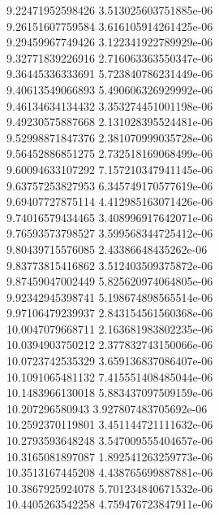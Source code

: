 {9.22471952598426 3.513025603751885e-06 \\
9.26151607759584 3.616105914261425e-06 \\
9.29459967749426 3.122341922789929e-06 \\
9.32771839226916 2.716063363550347e-06 \\
9.36445336333691 5.723840786231449e-06 \\
9.40613549066893 5.490606326929992e-06 \\
9.46134634134432 3.353274451001198e-06 \\
9.49230575887668 2.131028395524481e-06 \\
9.52998871847376 2.381070999035728e-06 \\
9.56452886851275 2.732518169068499e-06 \\
9.60094633107292 7.157210347941145e-06 \\
9.63757253827953 6.345749170577619e-06 \\
9.69407727875114 4.412985163071426e-06 \\
9.74016579434465 3.408996917642071e-06 \\
9.76593573798527 3.599568344725412e-06 \\
9.80439715576085 2.43386648435262e-06 \\
9.83773815416862 3.512403509375872e-06 \\
9.87459047002449 5.825620974064805e-06 \\
9.92342945398741 5.198674898565514e-06 \\
9.97106479239937 2.843154561560368e-06 \\
10.0047079668711 2.163681983802235e-06 \\
10.0394903750212 2.377832743150066e-06 \\
10.0723742535329 3.659136837086407e-06 \\
10.1091065481132 7.415551408485044e-06 \\
10.1483966130018 5.883437097509159e-06 \\
10.207296580943 3.927807483705692e-06 \\
10.2592370119801 3.451144721111632e-06 \\
10.2793593648248 3.547009555404657e-06 \\
10.3165081897087 1.892541263259773e-06 \\
10.3513167445208 4.438765699887881e-06 \\
10.3867925924078 5.701234840671532e-06 \\
10.4405263542258 4.759476723847911e-06 \\
}
